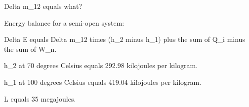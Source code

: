Delta m_12 equals what?

Energy balance for a semi-open system:

Delta E equals Delta m_12 times (h_2 minus h_1) plus the sum of Q_i minus the sum of W_n.

h_2 at 70 degrees Celsius equals 292.98 kilojoules per kilogram.

h_1 at 100 degrees Celsius equals 419.04 kilojoules per kilogram.

L equals 35 megajoules.